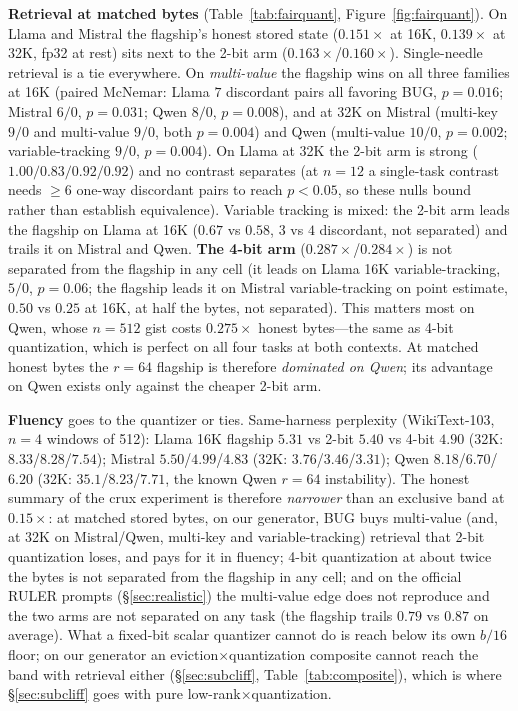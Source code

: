 \documentclass[11pt]{article}
\begin{document}
\textbf{Retrieval at matched bytes} (Table~\ref{tab:fairquant},
Figure~\ref{fig:fairquant}). On Llama and
Mistral the flagship's honest stored state ($0.151\times$ at 16K, $0.139\times$
at 32K, fp32 at rest) sits next to the 2-bit arm ($0.163\times$/$0.160\times$).
Single-needle retrieval is a tie everywhere. On \emph{multi-value} the flagship
wins on all three families at 16K (paired McNemar: Llama $7$ discordant pairs all
favoring BUG, $p{=}0.016$; Mistral $6/0$, $p{=}0.031$; Qwen $8/0$, $p{=}0.008$),
and at 32K on Mistral (multi-key $9/0$ and multi-value $9/0$, both
$p{=}0.004$) and Qwen (multi-value $10/0$, $p{=}0.002$; variable-tracking $9/0$,
$p{=}0.004$). On Llama at 32K the 2-bit arm is strong ($1.00/0.83/0.92/0.92$)
and no contrast separates (at $n{=}12$ a single-task contrast needs $\ge6$ one-way
discordant pairs to reach $p<0.05$, so these nulls bound rather than establish
equivalence). Variable tracking is mixed: the 2-bit arm leads the
flagship on Llama at 16K ($0.67$ vs $0.58$, $3$ vs $4$ discordant, not
separated) and trails it on Mistral and Qwen.
\textbf{The 4-bit arm} ($0.287\times$/$0.284\times$) is not separated from the
flagship in any cell (it leads on Llama 16K variable-tracking, $5/0$, $p{=}0.06$;
the flagship leads it on Mistral variable-tracking on point estimate, $0.50$ vs
$0.25$ at 16K, at half the bytes, not separated). This matters most on
Qwen, whose $n{=}512$ gist costs $0.275\times$ honest bytes---the same as 4-bit
quantization, which is perfect on all four tasks at both contexts. At matched
honest bytes the $r{=}64$ flagship is therefore \emph{dominated on Qwen}; its
advantage on Qwen exists only against the cheaper 2-bit arm.

\textbf{Fluency} goes to the quantizer or ties. Same-harness perplexity
(WikiText-103, $n{=}4$ windows of 512): Llama 16K flagship $5.31$ vs 2-bit $5.40$
vs 4-bit $4.90$ (32K: $8.33$/$8.28$/$7.54$); Mistral $5.50$/$4.99$/$4.83$ (32K:
$3.76$/$3.46$/$3.31$); Qwen $8.18$/$6.70$/$6.20$ (32K: $35.1$/$8.23$/$7.71$,
the known Qwen $r{=}64$ instability). The honest summary of the crux experiment
is therefore \emph{narrower} than an exclusive band at $0.15\times$: at matched
stored bytes, on our generator, BUG buys multi-value (and, at 32K on
Mistral/Qwen, multi-key and variable-tracking) retrieval that 2-bit quantization
loses, and pays for it in fluency; 4-bit quantization at about twice the bytes is
not separated from the flagship in any cell; and on the official RULER prompts
(\S\ref{sec:realistic}) the multi-value edge does not reproduce and the two arms
are not separated on any task (the flagship trails $0.79$ vs $0.87$ on average).
What a fixed-bit scalar quantizer cannot do is reach below its own $b/16$ floor;
on our generator an eviction$\times$quantization composite cannot reach the band with retrieval either
(\S\ref{sec:subcliff}, Table~\ref{tab:composite}), which is where \S\ref{sec:subcliff}
goes with pure low-rank$\times$quantization.
\end{document}
